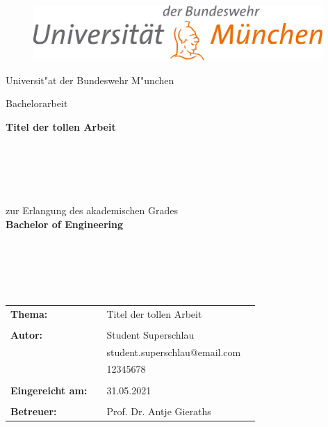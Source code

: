 

\thispagestyle{empty}

\begin{figure}[t]
	\centering
	\includegraphics[width=11.0cm]{bilder/logo/uni_logo_rgb.jpg}
\end{figure}

\begin{center}
	\Large{Universit"at der Bundeswehr M"unchen}\\
\end{center}

\begin{center}
	\Large
	Bachelorarbeit\\
\end{center}

\begin{center}	
	\baselineskip8mm
	\LARGE
	\bfseries{Titel der tollen Arbeit}\\
	\begin{verbatim}
		
	\end{verbatim}
	
\end{center}


\begin{verbatim}
	
	
\end{verbatim}


\begin{center}
	\baselineskip8mm
	zur Erlangung des akademischen Grades \\ \textbf{\large Bachelor of Engineering}
\end{center}


\begin{verbatim}
	
	
	
	
\end{verbatim}


\begin{flushleft}
	\begin{tabular}{llll}
		\textbf{Thema:} & & \parbox[t]{12cm}{Titel der tollen Arbeit} & \\
		& & \\
		\textbf{Autor:} & & Student Superschlau \\
		& & student.superschlau@email.com & \\
		& & 12345678 & \\
		& & \\
		\textbf{Eingereicht am:} & & 31.05.2021 &\\
		& & \\
		\textbf{Betreuer:} & & Prof. Dr. Antje Gieraths &\\
	\end{tabular}
\end{flushleft}
